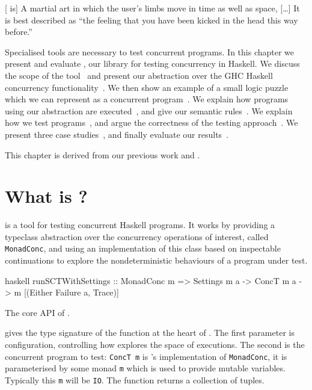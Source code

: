 \begin{displayquote}
  {[}\dejafu{} is] A martial art in which the user's limbs move in
  time as well as space, [\ldots] It is best described as ``the
  feeling that you have been kicked in the head this way
  before.'' \parencite{pratchett2001}
\end{displayquote}

\noindent
Specialised tools are necessary to test concurrent programs.  In this
chapter we present and evaluate \dejafu{}, our library for testing
concurrency in Haskell.  We discuss the scope of the
tool~ and present our abstraction over the GHC
Haskell concurrency functionality~.  We then
show an example of a small logic puzzle which we can represent as a
concurrent program~.  We explain how programs using
our abstraction are executed~, and give our
semantic rules~.  We explain how we test
programs~, and argue the correctness of the
testing approach~.  We present three case
studies~, and finally evaluate our
results~.

This chapter is derived from our previous work \cite{walker2015} and
\cite{YCS-2016-503}.

\section{What is \dejafu{}?}
\label{sec:dejafu-whatis}

\dejafu{} is a tool for testing concurrent Haskell programs.  It works
by providing a typeclass abstraction over the concurrency operations
of interest, called \verb|MonadConc|, and using an implementation of
this class based on inspectable continuations to explore the
nondeterministic behaviours of a program under test.

\begin{listing}
\centering
\begin{cminted}{haskell}
runSCTWithSettings :: MonadConc m
  => Settings m a
  -> ConcT m a
  -> m [(Either Failure a, Trace)]
\end{cminted}
\caption{The core API of \dejafu{}.}\label{lst:dejafucore}
\end{listing}

 gives the type signature of the function at the
heart of \dejafu{}.  The first parameter is configuration, controlling
how \dejafu{} explores the space of executions.  The second is the
concurrent program to test: \verb|ConcT m| is \dejafu{}'s
implementation of \verb|MonadConc|, it is parameterised by some monad
\verb|m| which is used to provide mutable variables.  Typically this
\verb|m| will be \verb|IO|.  The function returns a collection of
tuples.

